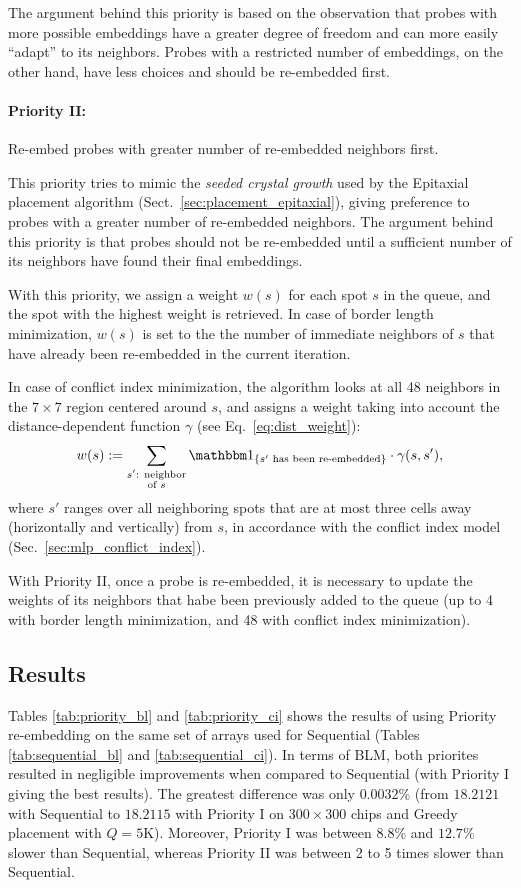 The argument behind this priority is based on the observation that probes with
more possible embeddings have a greater degree of freedom and can more easily
``adapt'' to its neighbors. Probes with a restricted number of embeddings, on
the other hand, have less choices and should be re-embedded first.

\paragraph{Priority II:} Re-embed probes with greater number of re-embedded
neighbors first.

This priority tries to mimic the \emph{seeded crystal growth} used by the
Epitaxial placement algorithm (Sect.~\ref{sec:placement_epitaxial}), giving
preference to probes with a greater number of re-embedded neighbors. The
argument behind this priority is that probes should not be re-embedded until a
sufficient number of its neighbors have found their final embeddings.

With this priority, we assign a weight $w(s)$ for each spot $s$ in the queue,
and the spot with the highest weight is retrieved. In case of border length
minimization, $w(s)$ is set to the the number of immediate neighbors of $s$ that
have already been re-embedded in the current iteration.

In case of conflict index minimization, the algorithm looks at all 48 neighbors
in the $7\times 7$ region centered around $s$, and assigns a weight taking into
account the distance-dependent function $\gamma$ (see Eq.~\ref{eq:dist_weight}):
\[
w(s) := \sum_{\substack{s'\text{: neighbor}\\\text{of } s}}
        \Ind{s'\text{ has been re-embedded}}
        \cdot \gamma(s,s'),
\]
where $s'$ ranges over all neighboring spots that are at most three cells away
(horizontally and vertically) from $s$, in accordance with the conflict index
model (Sec.~\ref{sec:mlp_conflict_index}).

With Priority II, once a probe is re-embedded, it is necessary to update the
weights of its neighbors that habe been previously added to the queue (up to 4
with border length minimization, and 48 with conflict index minimization).

\subsection{Results}

Tables \ref{tab:priority_bl} and \ref{tab:priority_ci} shows the results of
using Priority re-embedding on the same set of arrays used for Sequential
(Tables \ref{tab:sequential_bl} and \ref{tab:sequential_ci}). In terms of BLM,
both priorites resulted in negligible improvements when compared to Sequential
(with Priority I giving the best results). The greatest difference was only
$0.0032\%$ (from $18.2121$ with Sequential to $18.2115$ with Priority I on
$300\times 300$ chips and Greedy placement with $Q=5$K). Moreover, Priority I
was between $8.8\%$ and $12.7\%$ slower than Sequential, whereas Priority II was
between 2 to 5 times slower than Sequential.

